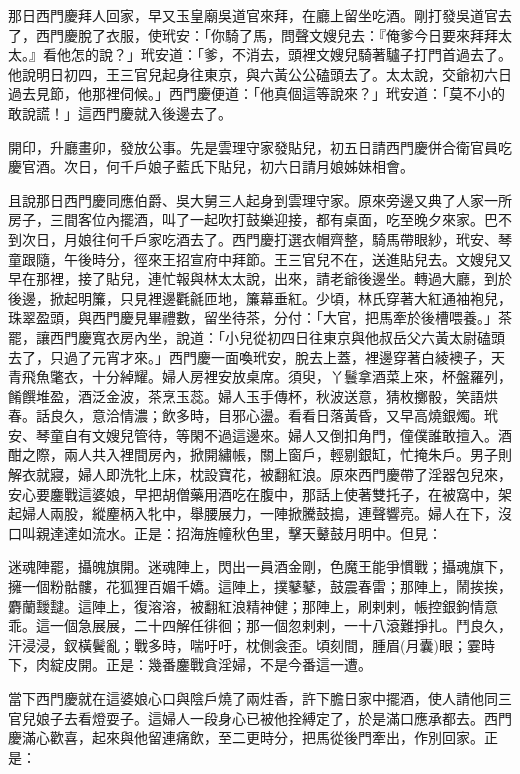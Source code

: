 那日西門慶拜人回家，早又玉皇廟吳道官來拜，在廳上留坐吃酒。剛打發吳道官去了，西門慶脫了衣服，使玳安：「你騎了馬，問聲文嫂兒去：『俺爹今日要來拜拜太太。』看他怎的說？」玳安道：「爹，不消去，頭裡文嫂兒騎著驢子打門首過去了。他說明日初四，王三官兒起身往東京，與六黃公公磕頭去了。太太說，交爺初六日過去見節，他那裡伺候。」西門慶便道：「他真個這等說來？」玳安道：「莫不小的敢說謊！」這西門慶就入後邊去了。

開印，升廳畫卯，發放公事。先是雲理守家發貼兒，初五日請西門慶併合衛官員吃慶官酒。次日，何千戶娘子藍氏下貼兒，初六日請月娘姊妹相會。

且說那日西門慶同應伯爵、吳大舅三人起身到雲理守家。原來旁邊又典了人家一所房子，三間客位內擺酒，叫了一起吹打鼓樂迎接，都有桌面，吃至晚夕來家。巴不到次日，月娘往何千戶家吃酒去了。西門慶打選衣帽齊整，騎馬帶眼紗，玳安、琴童跟隨，午後時分，徑來王招宣府中拜節。王三官兒不在，送進貼兒去。文嫂兒又早在那裡，接了貼兒，連忙報與林太太說，出來，請老爺後邊坐。轉過大廳，到於後邊，掀起明簾，只見裡邊氍毹匝地，簾幕垂紅。少頃，林氏穿著大紅通袖袍兒，珠翠盈頭，與西門慶見畢禮數，留坐待茶，分付：「大官，把馬牽於後槽喂養。」茶罷，讓西門慶寬衣房內坐，說道：「小兒從初四日往東京與他叔岳父六黃太尉磕頭去了，只過了元宵才來。」西門慶一面喚玳安，脫去上蓋，裡邊穿著白綾襖子，天青飛魚氅衣，十分綽耀。婦人房裡安放桌席。須臾，丫鬟拿酒菜上來，杯盤羅列，餚饌堆盈，酒泛金波，茶烹玉蕊。婦人玉手傳杯，秋波送意，猜枚擲骰，笑語烘春。話良久，意洽情濃；飲多時，目邪心盪。看看日落黃昏，又早高燒銀燭。玳安、琴童自有文嫂兒管待，等閑不過這邊來。婦人又倒扣角門，僮僕誰敢擅入。酒酣之際，兩人共入裡間房內，掀開繡帳，關上窗戶，輕剔銀缸，忙掩朱戶。男子則解衣就寢，婦人即洗牝上床，枕設寶花，被翻紅浪。原來西門慶帶了淫器包兒來，安心要鏖戰這婆娘，早把胡僧藥用酒吃在腹中，那話上使著雙托子，在被窩中，架起婦人兩股，縱麈柄入牝中，舉腰展力，一陣掀騰鼓搗，連聲響亮。婦人在下，沒口叫親達達如流水。正是：招海旌幢秋色里，擊天鼙鼓月明中。但見：

迷魂陣罷，攝魄旗開。迷魂陣上，閃出一員酒金剛，色魔王能爭慣戰；攝魂旗下，擁一個粉骷髏，花狐狸百媚千嬌。這陣上，撲鼕鼕，鼓震春雷；那陣上，鬧挨挨，麝蘭靉靆。這陣上，復溶溶，被翻紅浪精神健；那陣上，刷剌剌，帳控銀鉤情意乖。這一個急展展，二十四解任徘徊；那一個忽剌剌，一十八滾難掙扎。鬥良久，汗浸浸，釵橫鬢亂；戰多時，喘吁吁，枕側衾歪。頃刻間，腫眉(月囊)眼；霎時下，肉綻皮開。正是：幾番鏖戰貪淫婦，不是今番這一遭。

當下西門慶就在這婆娘心口與陰戶燒了兩炷香，許下膽日家中擺酒，使人請他同三官兒娘子去看燈耍子。這婦人一段身心已被他拴縛定了，於是滿口應承都去。西門慶滿心歡喜，起來與他留連痛飲，至二更時分，把馬從後門牽出，作別回家。正是：

